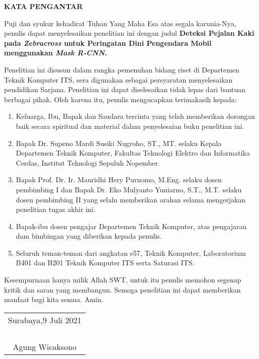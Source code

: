 \begin{center}
  \Large
  \textbf{KATA PENGANTAR}
\end{center}


Puji dan syukur kehadirat Tuhan Yang Maha Esa atas segala karunia-Nya, penulis  dapat menyelesaikan penelitian ini dengan judul \textbf{Deteksi Pejalan Kaki pada \textit{Zebracross} untuk Peringatan Dini Pengendara Mobil menggunakan \textit{Mask R-CNN}.}

Penelitian ini disusun dalam rangka pemenuhan bidang riset di Departemen Teknik Komputer ITS, sera digunakan sebagai persyaratan menyelesaikan pendidikan Sarjana. Penelitian ini dapat diselesaikan tidak lepas dari bantuan berbagai pihak. Oleh karena itu, penulis mengucapkan terimakasih kepada:

\begin{enumerate}[nolistsep]
  \item Keluarga, Ibu, Bapak dan Saudara tercinta yang telah memberikan dorongan baik secara spiritual dan material dalam penyelesaian buku penelitian ini.
  \item Bapak Dr. Supeno Mardi Susiki Nugroho, ST., MT. selaku Kepala Departemen Teknik Komputer, Fakultas Teknologi Elektro dan Informatika Cerdas, Institut Teknologi Sepuluh Nopember. 
  \item Bapak Prof. Dr. Ir. Mauridhi Hery Purnomo, M.Eng. selaku dosen pembimbing I dan Bapak Dr. Eko Mulyanto Yuniarno, S.T., M.T. selaku dosen pembimbing II yang selalu memberikan arahan selama mengerjakan penelitian tugas akhir ini.
  \item Bapak-ibu dosen pengajar Departemen Teknik Komputer, atas pengajaran dam bimbingan yang diberikan kepada penulis.
  \item Seluruh teman-teman dari angkatan e57, Teknik Komputer, Laboratorium B401 dan B201 Teknik Komputer ITS serta Saturasi ITS.
\end{enumerate}

Kesempurnaan hanya milik Allah SWT, untuk itu penulis memohon segenap kritik dan saran yang membangun. Semoga penelitian ini dapat memberikan manfaat bagi kita semua. Amin.


\begin{flushright}
  \begin{tabular}[b]{c}
    Surabaya,9 Juli 2021\\
    \\
    \\
    \\
    \\
    Agung Wicaksono
  \end{tabular}
\end{flushright}

